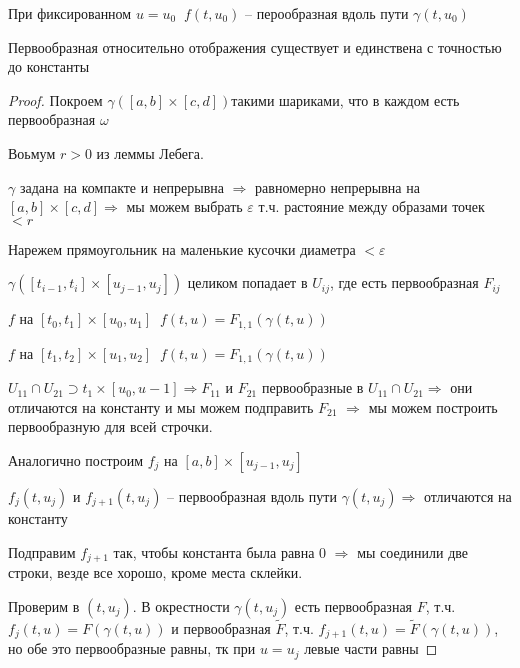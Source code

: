 \begin{remark}\thmslashn
	
	При фиксированном $u = u_0\;\; f(t, u_0)$ -- перообразная вдоль пути $\gamma(t, u_0)$ 

\end{remark}

\begin{theorem}\thmslashn

	Первообразная относительно отображения существует и единствена с точностью до константы

\end{theorem}

\begin{proof}\thmslashn
	
	Покроем $\gamma([a, b]\times[c, d])$такими шариками, что в каждом есть первообразная $\omega$
	
	Воьмум $r > 0$ из леммы Лебега. 
	
	$\gamma$ задана на компакте и непрерывна $\Rightarrow$ равномерно непрерывна на $[a, b]\times[c, d] \Rightarrow$ мы можем выбрать $\varepsilon$ т.ч. растояние между образами точек $< r$
	
	Нарежем прямоугольник на маленькие кусочки диаметра $< \varepsilon$ 
		
	$\gamma([t_{i-1}, t_i]\times[u_{j-1}, u_j])$ целиком попадает в $U_{ij}$, где есть первообразная $F_{ij}$
	
	$f$ на $[t_{0}, t_1]\times[u_{0}, u_1] \;\; f(t, u) = F_{1, 1}(\gamma(t, u))$ 
	
	$f$ на $[t_{1}, t_2]\times[u_{1}, u_2] \;\; f(t, u) = F_{1, 1}(\gamma(t, u))$ 
	
	$U_{11} \cap U_{21} \supset {t_1} \times[u_0, u-1] \Rightarrow F_{11}$ и $F_{21}$ первообразные в $U_{11} \cap U_{21} \Rightarrow$ они отличаются на константу и мы можем подправить $F_{21}$ $\Rightarrow$ мы можем построить первообразную для всей строчки.
	
	Аналогично построим $f_j$ на $[a, b]\times[u_{j-1}, u_j]$
	
	$f_j(t, u_j)$ и $f_{j+1}(t, u_j)$ -- первообразная вдоль пути $\gamma(t, u_j) \Rightarrow$ отличаются на константу
	
	Подправим $f_{j+1}$ так, чтобы константа была равна 0 $\Rightarrow$ мы соединили две строки, везде все хорошо, кроме места склейки.
	
	Проверим в $(t, u_j)$. В окрестности $\gamma(t, u_j)$ есть первообразная $F$, т.ч. $f_j(t, u) = F(\gamma(t, u))$ и первообразная $\tilde{F}$, т.ч. $f_{j+1}(t, u) = \tilde{F}(\gamma(t, u))$, но обе это первообразные равны, тк при $u = u_j$ левые части равны
	
\end{proof}
